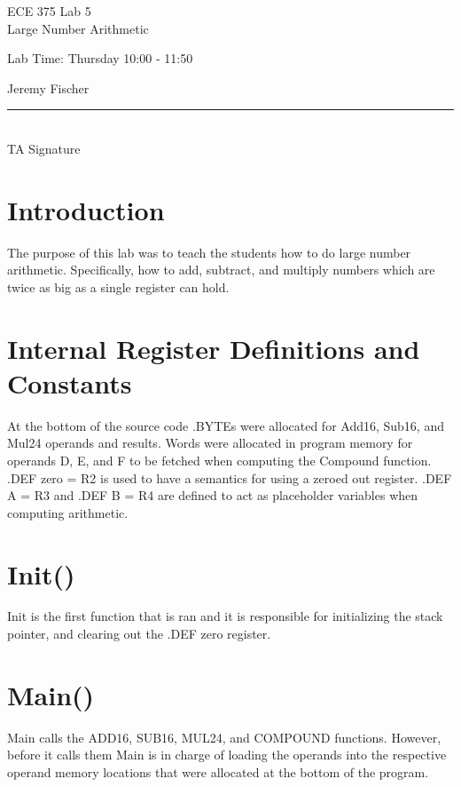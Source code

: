 \documentclass[12pt,letterpaper]{article}
\begin{document}
\begin{titlepage}
    \vspace*{4cm}
    \begin{flushright}
    {\huge
        ECE 375 Lab 5\\[1cm]
    }
    {\large
       Large Number Arithmetic
    }
    \end{flushright}
    \begin{flushleft}
    Lab Time: Thursday  10:00 - 11:50
    \end{flushleft}
    \begin{flushright}
    Jeremy Fischer

    \vfill
    \rule{5in}{.5mm}\\
    TA Signature
    \end{flushright}

\end{titlepage}

\section{Introduction}
	The purpose of this lab was to teach the students how to do large number arithmetic.
	Specifically, how to add, subtract, and multiply numbers which are twice as big as a single register can hold.

\section{Internal Register Definitions and Constants}
	At the bottom of the source code .BYTEs were allocated for Add16, Sub16, and Mul24 operands and results.
	Words were allocated in program memory for operands D, E, and F to be fetched when computing the Compound function.
	.DEF zero = R2 is used to have a semantics for using a zeroed out register.
	.DEF A = R3 and .DEF B = R4 are defined to act as placeholder variables when computing arithmetic.
	
\section{Init()}
	Init is the first function that is ran and it is responsible for initializing the stack pointer, and clearing out the .DEF zero register.

\section{Main()}
	Main calls the ADD16, SUB16, MUL24, and COMPOUND functions.
	However, before it calls them Main is in charge of loading the operands into the respective operand memory locations that were allocated at the bottom of the program.
\end{document}
